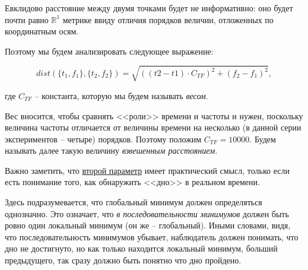 Евклидово расстояние между двумя точками будет не информативно: оно будет почти равно $\mathbb{R}^1$ метрике ввиду отличия порядков величин, отложенных по координатным осям.

Поэтому мы будем анализировать следующее выражение:

\begin{equation}\label{eq:wDist}
dist(\{t_1, f_1\}, \{t_2, f_2\}) = \sqrt{((t2 - t1) \cdot C_{TF}) ^2 + (f_2 - f_1) ^ 2},
\end{equation}

где $C_{TF}$ -- константа, которую мы будем называть \textit{весом}.

Вес вносится, чтобы сравнять <<роли>> времени и частоты и нужен, поскольку величина частоты отличается от величины времени на несколько (в данной серии экспериментов -- четыре) порядков. Поэтому положим $C_{TF} = 10000$. Будем называть далее такую величину \textit{взвешенным расстоянием}.

\begin{remark}\label{globalMin}
Важно заметить, что \hyperref[timeBottom]{второй параметр} имеет практический смысл, только если есть понимание того, как обнаружить <<дно>> в реальном времени.
\end{remark}

Здесь подразумевается, что глобальный минимум должен определяться однозначно. Это означает, что \textit{в последовательности минимумов} должен быть ровно один локальный минимум (он же -- глобальный). Иными словами, видя, что последовательность минимумов убывает, наблюдатель должен понимать, что дно не достигнуто, но как только находится локальный минимум, больший предыдущего, так сразу должно быть понятно что дно пройдено.